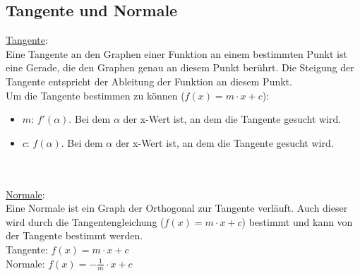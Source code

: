 \subsection{Tangente und Normale}
\underline{Tangente}: \\
Eine Tangente an den Graphen einer Funktion an einem bestimmten Punkt ist eine Gerade, 
die den Graphen genau an diesem Punkt berührt. 
Die Steigung der Tangente entspricht der Ableitung der Funktion an diesem Punkt. \\
Um die Tangente bestimmen zu können ($f(x) = m\cdot x + c$):
\begin{itemize}
    \item $m$: $f'(\alpha)$. Bei dem $\alpha$ der x-Wert ist, an dem die Tangente gesucht wird.
    \item $c$: $f(\alpha)$. Bei dem $\alpha$ der x-Wert ist, an dem die Tangente gesucht wird.
\end{itemize} 
\
\\\\
\underline{Normale}: \\
Eine Normale ist ein Graph der Orthogonal zur Tangente verläuft. 
Auch dieser wird durch die Tangentengleichung ($f(x) = m\cdot x + c$) bestimmt und kann von der Tangente bestimmt werden. \\
Tangente: $f(x) = m \cdot x + c$ \\
Normale: $f(x) = -\frac{1}{m} \cdot x + c$
